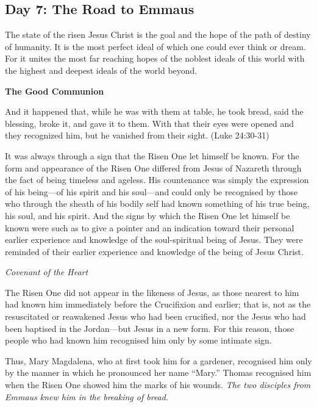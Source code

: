\subsection*{Day 7: The Road to Emmaus}
The state of the risen Jesus Christ is the goal and the hope of the path of destiny of humanity. It is the most perfect
ideal of which one could ever think or dream. For it unites the most far reaching hopes of the noblest ideals of this
world with the highest and deepest ideals of the world beyond.

\textbf{The Good Communion}

And it happened that, while he was with them at table, he took bread, said the blessing, broke it, and gave it to them.
With that their eyes were opened and they recognized him, but he vanished from their sight. (Luke 24:30-31)

\begin{quotationx}
It was always through a sign that the Risen One let himself be known. For the form and appearance of the Risen One
differed from Jesus of Nazareth through the fact of being timeless and ageless. His countenance was simply the
expression of his being—of his spirit and his soul—and could only be
recognised by those who through the sheath of his bodily self had known something of his true being, his soul, and his
spirit. And the signs by which the Risen One let himself be known were such as to give a pointer and an indication
toward their personal earlier experience and knowledge of the soul-spiritual being of Jesus. They were reminded of
their earlier experience and knowledge of the being of Jesus Christ. \begin{flushright} \emph{Covenant of the Heart}\end{flushright}

\end{quotationx}
The Risen One did not appear in the likeness of Jesus, as those nearest to him had known him immediately before the
Crucifixion and earlier; that is, not as the resuscitated or reawakened Jesus who had been crucified, nor the Jesus who
had been baptised in the Jordan—but Jesus in a new form. For this reason, those people who had
known him recognised him only by some intimate sign.

Thus, Mary Magdalena, who at first took him for a gardener, recognised him only by the manner in which he pronounced her
name “Mary.” Thomas recognised him when the Risen One showed him the marks of his wounds. \emph{The two disciples from
Emmaus knew him in the breaking of bread}.

